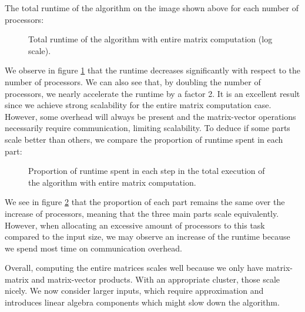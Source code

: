 The total runtime of the algorithm on the image shown above for each number of processors:
\begin{figure}[H]
 \centering
 
 \caption{Total runtime of the algorithm with entire matrix computation (log scale).}
 \label{fig:entire_runtime}
\end{figure}

We observe in figure \ref{fig:entire_runtime} that the runtime decreases significantly with respect to the number of processors.
We can also see that, by doubling the number of processors, we nearly accelerate the runtime by a factor 2.
It is an excellent result since we achieve strong scalability for the entire matrix computation case.
However, some overhead will always be present and the matrix-vector operations necessarily require communication, limiting scalability.
To deduce if some parts scale better than others, we compare the proportion of runtime spent in each part:
\begin{figure}[H]
 \centering
 
 \caption{Proportion of runtime spent in each step in the total execution of the algorithm with entire matrix computation.}
 \label{fig:entire_proportion}
\end{figure}

We see in figure \ref{fig:entire_proportion} that the proportion of each part remains the same over the increase of processors, meaning that the three main parts scale equivalently.
However, when allocating an excessive amount of processors to this task compared to the input size, we may observe an increase of the runtime because we spend most time on communication overhead.

Overall, computing the entire matrices scales well because we only have matrix-matrix and matrix-vector products.
With an appropriate cluster, those scale nicely.
We now consider larger inputs, which require approximation and introduces linear algebra components which might slow down the algorithm.
